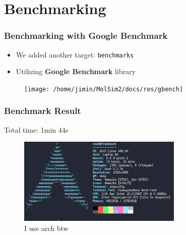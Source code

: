 
\section{Benchmarking}

\begin{frame}
    \frametitle{Benchmarking with Google Benchmark}

    \begin{itemize}
        \item We added another target: \texttt{benchmarks}
        \item Utilizing \textbf{Google Benchmark} library
    \end{itemize}
    \begin{figure}[H]
        \texttt{[image: /home/jimin/MolSim2/docs/res/gbench]}
    \end{figure}
\end{frame}

\begin{frame}
    \frametitle{Benchmark Result}

    Total time: 1min 44s

    \begin{figure}[H]
        \includegraphics[width=0.7\textwidth]{../../res/neofetch.png}
        \caption{I use arch btw}
    \end{figure}
\end{frame}
